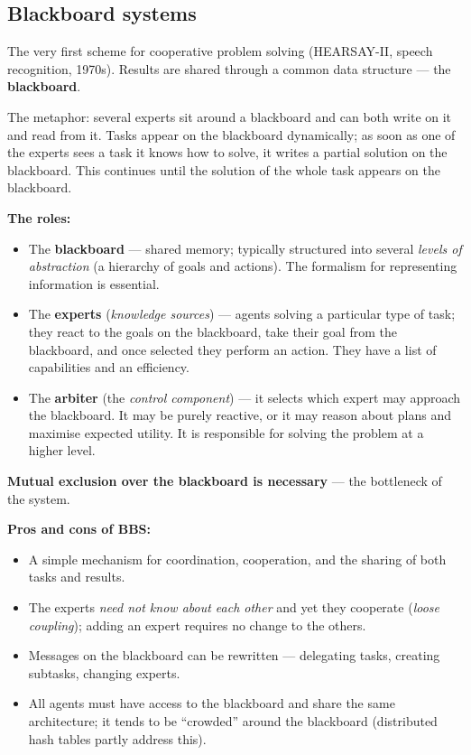 \documentclass[11pt,a4paper]{article}
\theoremstyle{definition}
\providecommand{\uv}[1]{``#1''}
\begin{document}
\subsection{Blackboard systems}

\begin{defbox}
The very first scheme for cooperative problem solving (HEARSAY-II, speech recognition, 1970s).
Results are shared through a common data structure --- the \textbf{blackboard}.

The metaphor: several experts sit around a blackboard and can both write on it and read from it. Tasks
appear on the blackboard dynamically; as soon as one of the experts sees a task it knows how to solve,
it writes a partial solution on the blackboard. This continues until the solution of the whole task
appears on the blackboard.

\textbf{The roles:}
\begin{itemize}
\item The \textbf{blackboard} --- shared memory; typically structured into several \emph{levels of
  abstraction} (a hierarchy of goals and actions). The formalism for representing information is
  essential.
\item The \textbf{experts} (\emph{knowledge sources}) --- agents solving a particular type of task;
  they react to the goals on the blackboard, take their goal from the blackboard, and once selected
  they perform an action. They have a list of capabilities and an efficiency.
\item The \textbf{arbiter} (the \emph{control component}) --- it selects which expert may approach the
  blackboard. It may be purely reactive, or it may reason about plans and maximise expected utility.
  It is responsible for solving the problem at a higher level.
\end{itemize}
\textbf{Mutual exclusion over the blackboard is necessary} --- the bottleneck of the system.
\end{defbox}

\textbf{Pros and cons of BBS:}
\begin{itemize}
\item[$+$] A simple mechanism for coordination, cooperation, and the sharing of both tasks and
  results.
\item[$+$] The experts \emph{need not know about each other} and yet they cooperate (\emph{loose
  coupling}); adding an expert requires no change to the others.
\item[$+$] Messages on the blackboard can be rewritten --- delegating tasks, creating subtasks,
  changing experts.
\item[$-$] All agents must have access to the blackboard and share the same architecture; it tends to
  be \uv{crowded} around the blackboard (distributed hash tables partly address this).
\end{itemize}
\end{document}

